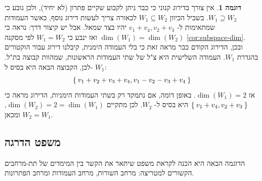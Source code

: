 \documentclass[12pt]{report}
\theoremstyle{plain}
\theoremstyle{definition}
\newtheorem{example}{דוגמה}[chapter]
\newcommand{\0}{\mathbf{0}}
\begin{document}
\begin{example}
אין צורך בדירוג קנוני כי כבר ניתן לקבוע שקיים פתרון (לא יחיד), ולכן נובע כי
$W_1\supseteq W_2$.
בשביל הכיוון
$W_1\subseteq W_2$
לכאורה צריך לעשות דירוג נוסף, כאשר העמודות שמתאימות ל-
$v_1+v_4,v_2+v_3$
יהיו בצד שמאל. אבל יש קיצור דרך: נראה כי
$\dim(W_1)=\dim(W_2)$
ואז ינבע כי
$W_1=W_2$
לפי מסקנה
\ref{cor:subspace-dim}.
ובכן, הדירוג הקודם כבר מראה זאת כי בלי העמודה הימנית, קיבלנו דירוג עבור הוקטורים בהגדרת
$W_1$.
העמודה השלישית היא צ"ל של שתי העמודות הראשונות, שמהוות קבוצה בת"ל. לכן, הקבוצה הבאה היא בסיס ל-
$W_1$:
$$
\Set{v_1+v_2+v_3+v_4,v_1-v_2-v_3+v_4}
$$
אז 
$\dim(W_1)=2$.
באופן דומה, אם נתמקד רק בשתי העמודות הימניות, הדירוג מראה כי
$\Set{v_1+v_4,v_2+v_3}$
היא בסיס ל-
$W_2$.
לכן מתקיים
$\dim(W_2)=2=\dim(W_1)$,
ומכאן 
$W_2=W_1$.
\end{example}

\subsection{משפט הדרגה}

הדוגמה הבאה היא הכנה לקראת משפט שיתאר את הקשר בין המימדים של תת-מרחבים הקשורים למטריצה: מרחב השורות, מרחב העמודות ומרחב הפתרונות.
\end{document}
